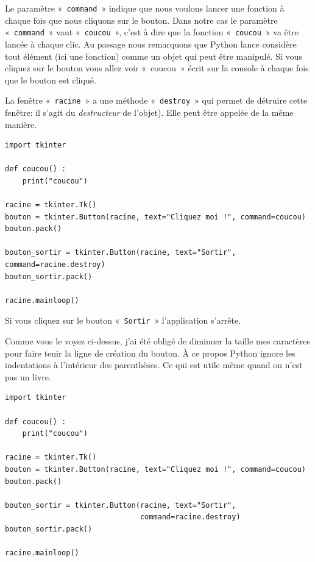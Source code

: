 Le paramètre « \texttt{command} » indique que nous voulons lancer une fonction à chaque fois que nous cliquons sur le bouton. Dans notre cas le paramètre « \texttt{command} » vaut « \texttt{coucou} », c'est à dire que la fonction « \texttt{coucou} » va être lancée à chaque clic. Au passage nous remarquons que Python lance considère tout élément (ici une fonction) comme un objet qui peut être manipulé. Si vous cliquez sur le bouton vous allez voir « coucou »  écrit sur la console à chaque fois que le bouton est cliqué.


La fenêtre « \texttt{racine} » a une méthode « \texttt{destroy} » qui permet de détruire cette fenêtre: il s'agit du \emph{destructeur} de l'objet). Elle peut être appelée de la même manière.

\begin{small}
\begin{Verbatim}[frame=single,rulecolor=\color{mbleu}, label=à taper]
import tkinter

def coucou() :
    print("coucou")

racine = tkinter.Tk()
bouton = tkinter.Button(racine, text="Cliquez moi !", command=coucou)
bouton.pack()

bouton_sortir = tkinter.Button(racine, text="Sortir", command=racine.destroy)
bouton_sortir.pack()

racine.mainloop()
\end{Verbatim}
\end{small}

Si vous cliquez sur le bouton « \texttt{Sortir} » l'application s'arrête.

Comme vous le voyez ci-dessus, j'ai été obligé de diminuer la taille mes caractères pour faire tenir la ligne de création du bouton. À ce propos Python ignore les indentations à l'intérieur des parenthèses. Ce qui est utile même quand on n'est pas un livre. 

\begin{Verbatim}[frame=single,rulecolor=\color{gray}, label=ne pas saisir]
import tkinter

def coucou() :
    print("coucou")

racine = tkinter.Tk()
bouton = tkinter.Button(racine, text="Cliquez moi !", command=coucou)
bouton.pack()

bouton_sortir = tkinter.Button(racine, text="Sortir",
                               command=racine.destroy)
bouton_sortir.pack()

racine.mainloop()
\end{Verbatim}
 

